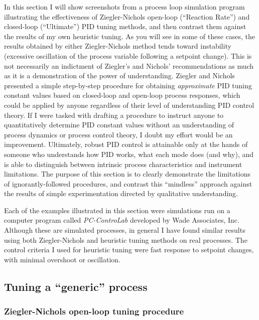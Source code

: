 In this section I will show screenshots from a process loop simulation program illustrating the effectiveness of Ziegler-Nichols open-loop (``Reaction Rate'') and closed-loop (``Ultimate'') PID tuning methods, and then contrast them against the results of my own heuristic tuning.  As you will see in some of these cases, the results obtained by either Ziegler-Nichols method tends toward instability (excessive oscillation of the process variable following a setpoint change).  This is not necessarily an indictment of Ziegler's and Nichols' recommendations as much as it is a demonstration of the power of understanding.  Ziegler and Nichols presented a simple step-by-step procedure for obtaining \textit{approximate} PID tuning constant values based on closed-loop and open-loop process responses, which could be applied by anyone regardless of their level of understanding PID control theory.  If I were tasked with drafting a procedure to instruct anyone to quantitatively determine PID constant values without an understanding of process dynamics or process control theory, I doubt my effort would be an improvement.  Ultimately, robust PID control is attainable only at the hands of someone who understands how PID works, what each mode does (and why), and is able to distinguish between intrinsic process characteristics and instrument limitations.  The purpose of this section is to clearly demonstrate the limitations of ignorantly-followed procedures, and contrast this ``mindless'' approach against the results of simple experimentation directed by qualitative understanding.

\vskip 10pt

Each of the examples illustrated in this section were simulations run on a computer program called \textit{PC-ControLab} developed by Wade Associates, Inc.  Although these are simulated processes, in general I have found similar results using both Ziegler-Nichols and heuristic tuning methods on real processes.  The control criteria I used for heuristic tuning were fast response to setpoint changes, with minimal overshoot or oscillation.    






\filbreak
\subsection{Tuning a ``generic'' process}

\subsubsection{Ziegler-Nichols open-loop tuning procedure}

